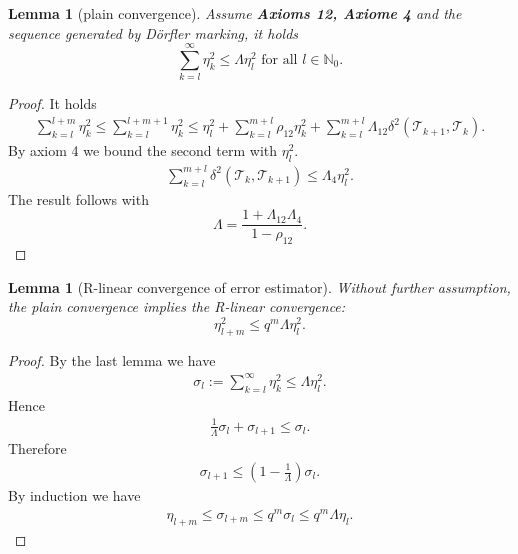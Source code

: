\documentclass[a4paper,12pt,oneside,fleqn]{book}
\newtheorem{lemma}[theorem]{Lemma}
\theoremstyle{definition}
\theoremstyle{remark}
\begin{document}
\begin{lemma}[plain convergence]
	Assume \textbf{Axioms 12, Axiome 4} and the sequence generated by D\"orfler marking, it holds
	\begin{equation*}
		\sum_{k = l}^{\infty} \eta_k^2 \le \Lambda \eta_l^2 \text{ for all } l \in \mathbb{N}_0.
	\end{equation*}
\end{lemma}
\begin{proof}
	It holds
	\begin{align*}
		\sum_{k = l}^{l + m} \eta_k^2 \le \sum_{k = l}^{l + m + 1} \eta_k^2 
		\le \eta_l^2 +  \sum_{k = l}^{m + l} \rho_{12} \eta_k^2 + \sum_{k = l}^{m + l} \Lambda_{12} \delta^2(\mathcal{T}_{k + 1}, \mathcal{T}_k). 
	\end{align*}
	By axiom 4 we bound the second term with $\eta_l^2$. 
	\begin{align*}
		\sum_{k = l}^{m + l} \delta^2(\mathcal{T}_k, \mathcal{T}_{k + 1}) \le \Lambda_4 \eta_l^2.
	\end{align*}
	The result follows with
	\begin{equation}
		\Lambda = \frac{1 + \Lambda_{12} \Lambda_4 }{1 - \rho_{12}}.
	\end{equation}
\end{proof}


\begin{lemma}[R-linear convergence of error estimator]
Without further assumption, the plain convergence implies the R-linear convergence:
\begin{equation}
	\eta_{l + m}^2 \le q^m \Lambda \eta_l^2. 
\end{equation}
\end{lemma}
\begin{proof}
By the last lemma we have
\begin{align*}
	\sigma_{l} := \sum_{k = l}^\infty \eta_k^2 \le \Lambda \eta_l^2.
\end{align*}
Hence
\begin{align*}
	\frac{1}{\Lambda} \sigma_l + \sigma_{l + 1} \le \sigma_l. 
\end{align*}
Therefore
\begin{align*}
	\sigma_{l + 1} \le (1 - \frac{1}{\Lambda}) \sigma_l.
\end{align*}
By induction we have
\begin{align*}
	\eta_{l + m} \le \sigma_{l + m} \le q^m \sigma_l \le q^m\Lambda \eta_l.
\end{align*}
\end{proof}
\end{document}
